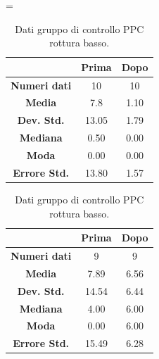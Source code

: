 \begin{table}
\centering
\setlength\tabcolsep{4pt}
\begin{minipage}{0.48\textwidth}
\centering
\tablewidth=\textwidth

\begin{tabular}{|c|c|c|} \hline
{\textbf{}} & {\textbf{  \hspace{8pt}Prima\hspace{8pt} }} & {\textbf{ \hspace{8pt}Dopo\hspace{8pt}  }}\\ \hline
\textbf{Numeri dati} & 10 & 10 \\ 
\textbf{Media} & 7.8 & 1.10 \\  
\textbf{Dev. Std.} & 13.05 & 1.79 \\  
\textbf{Mediana} & 0.50 & 0.00 \\ 
\textbf{Moda} & 0.00 & 0.00 \\ 
\textbf{Errore Std.} & 13.80 & 1.57 \\ 
\hline
\end{tabular}
\caption{Dati gruppo sperimentale PPC rottura basso.}

\label{tab:accuracy} 
\end{minipage}%
\hfill
\begin{minipage}{0.48\textwidth}
\centering

\begin{tabular}{|c|c|c|} \hline
{\textbf{}} & {\textbf{  \hspace{8pt}Prima\hspace{8pt} }} & {\textbf{ \hspace{8pt}Dopo\hspace{8pt}  }}\\ \hline
\textbf{Numeri dati} & 9 & 9 \\ 
\textbf{Media} & 7.89 & 6.56 \\  
\textbf{Dev. Std.} & 14.54 & 6.44 \\  
\textbf{Mediana} & 4.00 & 6.00 \\  
\textbf{Moda} & 0.00 & 6.00 \\
\textbf{Errore Std.} & 15.49 & 6.28 \\
\hline
\end{tabular}
\caption{Dati gruppo di controllo PPC rottura basso.}

 \label{tab:ompdiff} 
\end{minipage}
\hfill
\begin{minipage}{0.48\textwidth}
\centering


\end{minipage}
\end{table}
